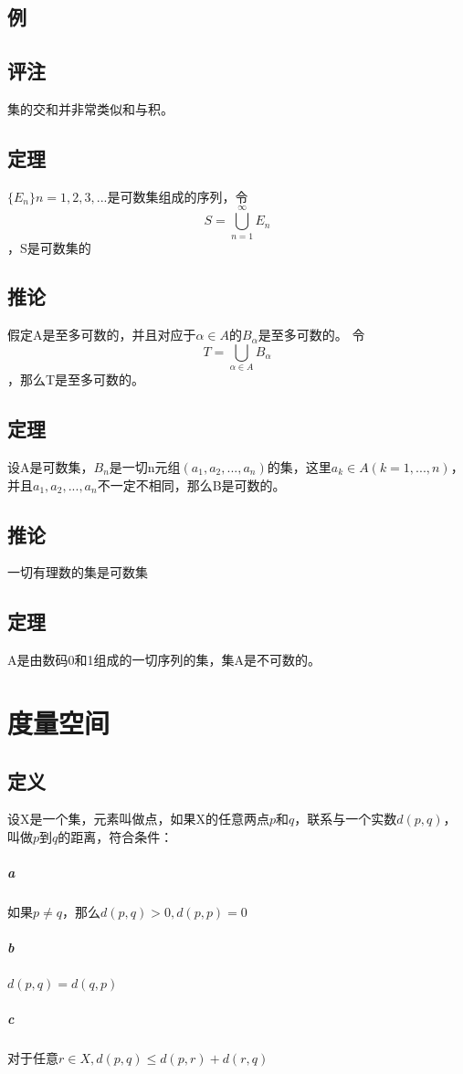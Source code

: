 \section{例}
\section{评注}集的交和并非常类似和与积。
\section{定理}$\{E_n\} n=1,2,3,...$是可数集组成的序列，令$$ S=\bigcup_{n=1}^{\infty}E_n$$，S是可数集的
\section*{推论} 假定A是至多可数的，并且对应于$ \alpha \in A $的$B_{\alpha}$是至多可数的。
令$$ T = \bigcup_{\alpha \in A}{B_{\alpha}} $$，那么T是至多可数的。
\section{定理} 设A是可数集，$B_n$是一切n元组$(a_1, a_2, ..., a_n)$的集，这里$ a_k \in A (k = 1, ..., n)$，并且$a_1, a_2, ..., a_n $不一定不相同，那么B是可数的。
\section*{推论}一切有理数的集是可数集
\section{定理}A是由数码0和1组成的一切序列的集，集A是不可数的。
\subparagraph*{}
\chapter*{度量空间}
\section{定义} 设X是一个集，元素叫做点，如果X的任意两点$p$和$q$，联系与一个实数$d(p, q)$，叫做$p$到$q$的距离，符合条件：
\paragraph{a} 如果$p \ne q$，那么$d(p, q) > 0, d(p, p) = 0$
\paragraph{b} $ d(p, q) = d(q, p) $
\paragraph{c} 对于任意$ r \in X, d(p, q) \le d(p, r) + d(r, q) $
